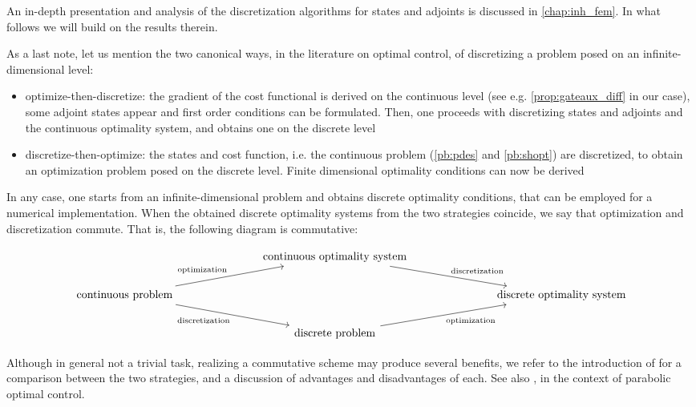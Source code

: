 \documentclass[english,a4paper,9pt,oneside]{scrbook}	%
\theoremstyle{break}
\theoremstyle{remark}
\begin{document}
An in-depth presentation and analysis of the discretization algorithms for states and adjoints is discussed in \cref{chap:inh_fem}. In what follows we will build on the results therein.

As a last note, let us mention the two canonical ways, in the literature on optimal control, of discretizing a problem posed on an infinite-dimensional level:

\begin{itemize}
	\item optimize-then-discretize: the gradient of the cost functional is derived on the continuous level (see e.g. \cref{prop:gateaux_diff} in our case), some adjoint states appear and first order conditions can be formulated. Then, one proceeds with discretizing states and adjoints and the continuous optimality system, and obtains one on the discrete level
	\item discretize-then-optimize: the states and cost function, i.e. the continuous problem (\cref{pb:pdes} and \cref{pb:shopt}) are discretized, to obtain an optimization problem posed on the discrete level. Finite dimensional optimality conditions can now be derived
\end{itemize}

In any case, one starts from an infinite-dimensional problem and obtains discrete optimality conditions, that can be employed for a numerical implementation. When the obtained discrete optimality systems from the two strategies coincide, we say that optimization and discretization commute. That is, the following diagram is commutative:

\[\begin{tikzcd}
	&&& \text{continuous optimality system} \\
	\text{continuous problem} &&&&&& \text{discrete optimality system}  \\
	&&& \text{discrete problem} 
	\arrow["{\text{optimization}}"', from=3-4, to=2-7]
	\arrow["{\text{discretization}}", from=1-4, to=2-7]
	\arrow["{\text{optimization}}", from=2-1, to=1-4]
	\arrow["{\text{discretization}}"', from=2-1, to=3-4]
\end{tikzcd}\]

Although in general not a trivial task, realizing a commutative scheme may produce several benefits, we refer to the introduction of \cite{liu} for a comparison between the two strategies, and a discussion of advantages and disadvantages of each. See also \cite{flaig}, in the context of parabolic optimal control.
\end{document}
